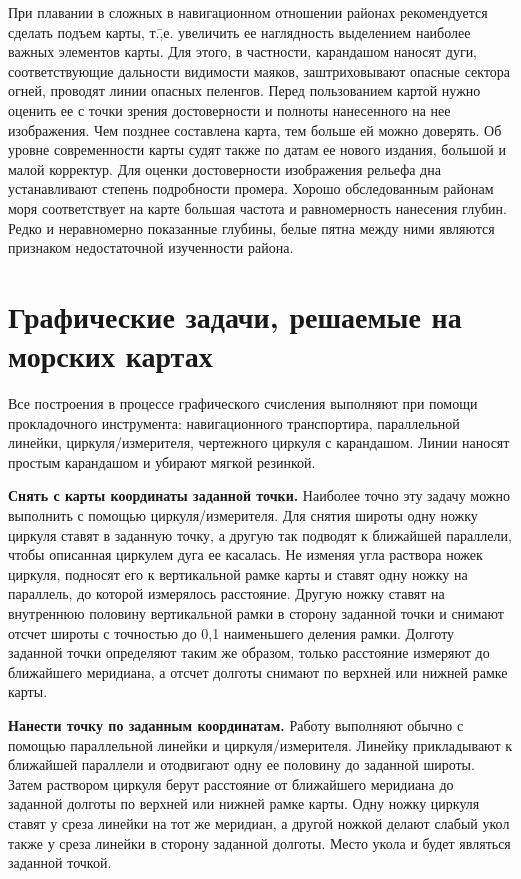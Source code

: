 \documentclass[a4paper, 12pt, twoside, final, book, russian, fittopage, cyremdash]{ncc}
\begin{document}
При плавании в сложных в навигационном отношении районах рекомендуется сделать подъем карты, т.\=,е. увеличить ее наглядность выделением наиболее важных элементов карты. Для этого, в частности, карандашом наносят дуги, соответствующие дальности видимости маяков, заштриховывают опасные сектора огней, проводят линии опасных пеленгов. Перед пользованием картой нужно оценить ее с точки зрения достоверности и полноты нанесенного на нее изображения. Чем позднее составлена карта, тем больше ей можно доверять. Об уровне современности карты судят также по датам ее нового издания, большой и малой корректур. Для оценки достоверности изображения рельефа дна устанавливают степень подробности промера. Хорошо обследованным районам моря соответствует на карте большая частота и равномерность нанесения глубин. Редко и неравномерно показанные глубины, белые пятна между ними являются признаком недостаточной изученности района. 

\section{Графические задачи, решаемые на морских картах}

Все построения в процессе графического счисления выполняют при помощи прокладочного инструмента: навигационного транспортира, параллельной линейки, циркуля\-/измерителя, чертежного циркуля с карандашом. Линии наносят простым карандашом и убирают мягкой резинкой. 

\textbf{Снять с карты координаты заданной точки.} Наиболее точно эту задачу можно выполнить с помощью циркуля\-/измерителя. Для снятия широты одну ножку циркуля ставят в заданную точку, а другую так подводят к ближайшей параллели, чтобы описанная циркулем дуга ее касалась. Не изменяя угла раствора ножек циркуля, подносят его к вертикальной рамке карты и ставят одну ножку на параллель, до которой измерялось расстояние. Другую ножку ставят на внутреннюю половину вертикальной рамки в сторону заданной точки и снимают отсчет широты с точностью до 0,1 наименьшего деления рамки. Долготу заданной точки определяют таким же образом, только расстояние измеряют до ближайшего меридиана, а отсчет долготы снимают по верхней или нижней рамке карты. 

\textbf{Нанести точку по заданным координатам.} Работу выполняют обычно с помощью параллельной линейки и циркуля\-/измерителя. Линейку прикладывают к ближайшей параллели и отодвигают одну ее половину до заданной широты. Затем раствором циркуля берут расстояние от ближайшего меридиана до заданной долготы по верхней или нижней рамке карты. Одну ножку циркуля ставят у среза линейки на тот же меридиан, а другой ножкой делают слабый укол также у среза линейки в сторону заданной долготы. Место укола и будет являться заданной точкой.
\end{document}
